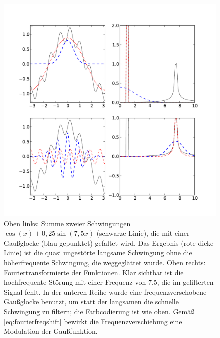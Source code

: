 \begin{figure}
  \centering
  \includegraphics[width=\textwidth]{plots/fouriertrafo}
  \caption{Oben links: Summe zweier Schwingungen $\cos(x) +
    0,25\sin(7,5 x)$ (schwarze Linie), die mit einer Gaußglocke (blau
    gepunktet) gefaltet wird. Das Ergebnis (rote dicke Linie) ist die
    quasi ungestörte langsame Schwingung ohne die höherfrequente
    Schwingung, die weggeglättet wurde. Oben rechts:
    Fouriertransformierte der Funktionen. Klar sichtbar ist die
    hochfrequente Störung mit einer Frequenz von 7,5, die im
    gefilterten Signal fehlt. In der unteren Reihe wurde eine
    frequenzverschobene Gaußglocke benutzt, um statt der langsamen die
    schnelle Schwingung zu filtern; die Farbcodierung ist wie
    oben. Gemäß \eqref{eq:fourierfreqshift} bewirkt die
    Frequenzverschiebung eine Modulation der Gaußfunktion.}
  \label{fig:fourierfaltung}
\end{figure}

